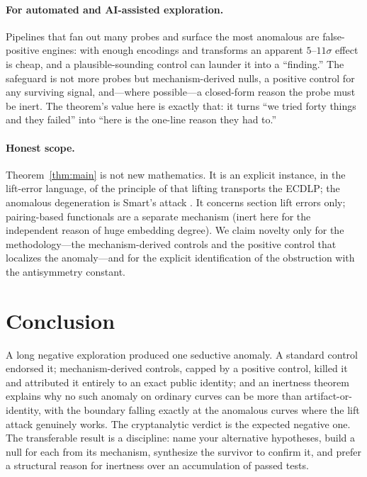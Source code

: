 \documentclass[11pt]{article}
\theoremstyle{definition}
\begin{document}
\paragraph{For automated and AI-assisted exploration.} Pipelines that fan
out many probes and surface the most anomalous are false-positive
engines: with enough encodings and transforms an apparent $5$--$11\sigma$
effect is cheap, and a plausible-sounding control can launder it into a
``finding.'' The safeguard is not more probes but mechanism-derived nulls,
a positive control for any surviving signal, and---where possible---a
closed-form reason the probe must be inert. The theorem's value here is
exactly that: it turns ``we tried forty things and they failed'' into
``here is the one-line reason they had to.''

\paragraph{Honest scope.} Theorem~\ref{thm:main} is not new mathematics.
It is an explicit instance, in the lift-error language, of the principle
of \cite{silvermanlift,silverman4faces,gadiyarpadma} that lifting
transports the ECDLP; the anomalous degeneration is Smart's attack
\cite{smart}. It concerns section lift errors only; pairing-based
functionals are a separate mechanism (inert here for the independent
reason of huge embedding degree). We claim novelty only for the
methodology---the mechanism-derived controls and the positive control
that localizes the anomaly---and for the explicit identification of the
obstruction with the antisymmetry constant.

\section{Conclusion}

A long negative exploration produced one seductive anomaly. A standard
control endorsed it; mechanism-derived controls, capped by a positive
control, killed it and attributed it entirely to an exact public
identity; and an inertness theorem explains why no such anomaly on
ordinary curves can be more than artifact-or-identity, with the boundary
falling exactly at the anomalous curves where the lift attack genuinely
works. The cryptanalytic verdict is the expected negative one. The
transferable result is a discipline: name your alternative hypotheses,
build a null for each from its mechanism, synthesize the survivor to
confirm it, and prefer a structural reason for inertness over an
accumulation of passed tests.
\end{document}
